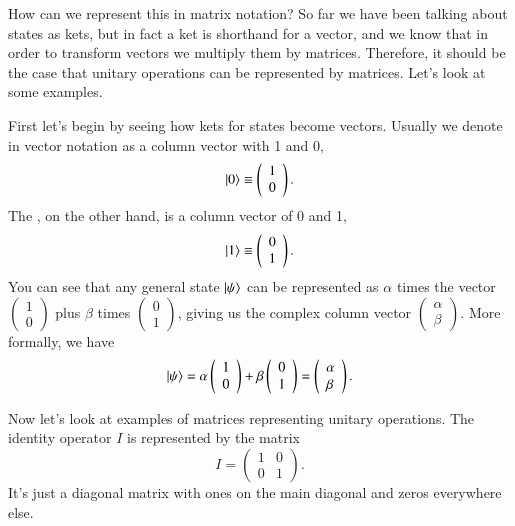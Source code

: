 How can we represent this in matrix notation? So far we have been talking about states as kets, but in fact a ket is shorthand for a vector, and we know that in order to transform vectors we multiply them by matrices. Therefore, it should be the case that unitary operations can be represented by matrices. Let's look at some examples. 

First let's begin by seeing how kets for states become vectors. Usually we denote  in vector notation as a column vector with 1 and 0,
\begin{equation}
\left| 0 \right\rangle\equiv\left(\begin{array}{l}
1 \\
0
\end{array}\right).
\end{equation}
The , on the other hand, is a column vector of 0 and 1,
\begin{equation}
\left| 1 \right\rangle\equiv\left(\begin{array}{l}
0 \\
1
\end{array}\right).
\end{equation}
You can see that any general state $\left| \psi \right\rangle$ can be represented as $\alpha$ times the vector $\left(\begin{array}{l}
1 \\
0
\end{array}\right)$ plus $\beta$ times $\left(\begin{array}{l}
0 \\
1
\end{array}\right)$, giving us the complex column vector $\left(\begin{array}{l}
\alpha \\
\beta
\end{array}\right)$. More formally, we have
\begin{equation}
\left| \psi \right\rangle=\alpha\left(\begin{array}{l}
1 \\
0
\end{array}\right)+\beta\left(\begin{array}{l}
0 \\
1
\end{array}\right)=\left(\begin{array}{l}
\alpha \\
\beta
\end{array}\right).
\end{equation}


Now let's look at examples of matrices representing unitary operations. The identity operator $I$ is represented by the matrix
\begin{equation}
I=\left(\begin{array}{ll}
1 & 0 \\
0 & 1
\end{array}\right).
\end{equation}
It's just a diagonal matrix with ones on the main diagonal and zeros everywhere else.

